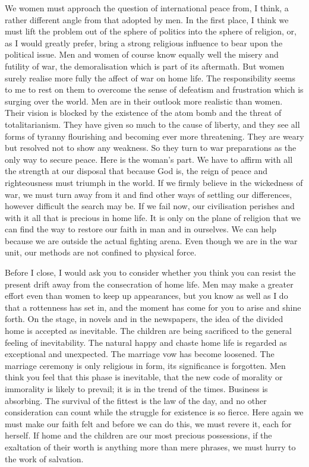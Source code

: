 \documentclass[14pt, article, extrafontsizes, twopage, a4paper]{memoir}
\begin{document}
We women must approach the question of international
peace from, I think, a rather different angle from that
adopted by men. In the first place, I think we must lift
the problem out of the sphere of politics into the sphere
of religion, or, as I would greatly prefer, bring a strong
religious influence to bear upon the political issue. Men
and women of course know equally well the misery and
futility of war, the demoralisation which is part of its
aftermath. But women surely realise more fully the affect
of war on home life. The responsibility seems to me to
rest on them to overcome the sense of defeatism and
frustration which is surging over the world. Men are in
their outlook more realistic than women. Their vision is
blocked by the existence of the atom bomb and the threat of
totalitarianism. They have given so much to the cause of
liberty, and they see all forms of tyranny flourishing and
becoming ever more threatening. They are weary but
resolved not to show any weakness. So they turn to war
preparations as the only way to secure peace. Here is the
woman's part. We have to affirm with all the strength at
our disposal that because God is, the reign of peace and
righteousness must triumph in the world. If we firmly
believe in the wickedness of war, we must turn away from it
and find other ways of settling our differences, however
difficult the search may be. If we fail now, our civilisation
perishes and with it all that is precious in home
life. It is only on the plane of religion that we can find
the way to restore our faith in man and in ourselves. We
can help because we are outside the actual fighting arena.
Even though we are in the war unit, our methods are not
confined to physical force.


Before I close, I would ask you to consider whether
you think you can resist the present drift away from the
consecration of home life. Men may make a greater effort
even than women to keep up appearances, but you know as
well as I do that a rottenness has set in, and the moment
has come for you to arise and shine forth. On the stage,
in novels and in the newspapers, the idea of the divided
home is accepted as inevitable. The children are being
sacrificed to the general feeling of inevitability. The
natural happy and chaste home life is regarded as
exceptional and unexpected. The marriage vow has become
loosened. The marriage ceremony is only religious in form,
its significance is forgotten. Men think you feel that
this phase is inevitable, that the new code of morality or
immorality is likely to prevail; it is in the trend of the
times. Business is absorbing. The survival of the fittest
is the law of the day, and no other consideration can count
while the struggle for existence is so fierce. Here again
we must make our faith felt and before we can do this, we
must revere it, each for herself. If home and the children
are our most precious possessions, if the exaltation of
their worth is anything more than mere phrases, we must
hurry to the work of salvation.
\end{document}
